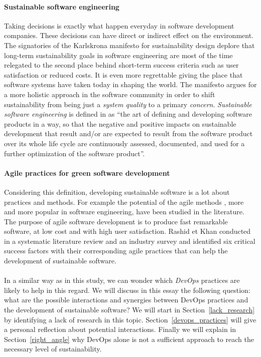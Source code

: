 \documentclass[11pt,twocolumn]{article}
\begin{document}
\paragraph{Sustainable software engineering}
Taking decisions is exactly what happen everyday in software development companies. These decisions can have direct or indirect effect on the environment. The signatories of the Karlskrona manifesto for sustainability design \cite{beckerSustainabilityDesignSoftware2015} deplore that long-term sustainability goals in software engineering are most of the time relegated to the second place behind short-term success criteria such as user satisfaction or reduced costs. It is even more regrettable giving the place that software systems have taken today in shaping the world. The manifesto argues for a more holistic approach in the software community in order to shift sustainability from being just a \textit{system quality} to a primary \textit{concern}.
\textit{Sustainable software engineering} is defined in \cite{naumannGREENSOFTModelReference2011} as ``the art
of defining and developing software products in a way, so that
the negative and positive impacts on sustainable development that
result and/or are expected to result from the software product over
its whole life cycle are continuously assessed, documented, and
used for a further optimization of the software product''.

\paragraph{Agile practices for green software development}
Considering this definition, developing sustainable software is a lot about practices and methods. For example the potential of the agile methods \cite{beckManifestoAgileSoftware2001}, more and more popular in software engineering, have been studied in the literature. The purpose of agile software development is to produce fast remarkable software, at low cost and with high user satisfaction. 
Rashid et Khan conducted in \cite{rashidAgilePracticesGlobal2018} a systematic literature review and an industry survey and identified six critical success factors with their corresponding agile practices that can help the development of sustainable software. 

\paragraph{}
In a similar way as in this study, we can wonder which \textit{DevOps} practices are likely to help in this regard. We will discuss in this essay the following question: what are the possible interactions and synergies between DevOps practices and the development of sustainable software? 
We will start in Section~\ref{lack_research} by identifying a lack of research in this topic. Section~\ref{devops_practices} will give a personal reflection about potential interactions. Finally we will explain in Section~\ref{right_angle} why DevOps alone is not a sufficient approach to reach the necessary level of sustainability.
\end{document}
